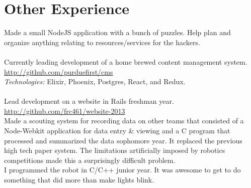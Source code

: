 \documentclass[11pt,letter,sans]{moderncv}
\begin{document}
\section{Other Experience}
Made a small NodeJS application with a bunch of puzzles.
Help plan and organize anything relating to resources/services for the hackers.
\\
\\
Currently leading development of a home brewed content management system. \url{http://github.com/purduefirst/cms}
\\
\textit{Technologies:} Elixir, Phoenix, Postgres, React, and Redux.
\\
\\
Lead development on a website in Rails freshman year. \url{http://github.com/frc461/website-2013}
\\
Made a scouting system for recording data on other teams that consisted of a Node-Webkit application for data entry \& viewing and a C program that processed and summarized the data sophomore year.
It replaced the previous high tech paper system.
The limitations artificially imposed by robotics competitions made this a surprisingly difficult problem.
\\
I programmed the robot in C/C++ junior year.
It was awesome to get to do something that did more than make lights blink.
\end{document}
